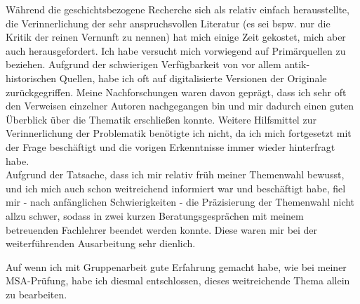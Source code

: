 \documentclass[12pt,a4paper,final]{article}
\begin{document}
Während die geschichtsbezogene Recherche sich als relativ einfach herausstellte, die Verinnerlichung der sehr anspruchsvollen Literatur (es sei bspw. nur die Kritik der reinen Vernunft %
 zu nennen) hat mich einige Zeit gekostet, mich aber auch herausgefordert. Ich habe versucht mich vorwiegend auf Primärquellen zu beziehen. Aufgrund der schwierigen Verfügbarkeit von vor allem antik-historischen Quellen, habe ich oft auf digitalisierte Versionen der Originale zurückgegriffen.
Meine Nachforschungen waren davon geprägt, dass ich sehr oft den Verweisen einzelner Autoren nachgegangen bin und mir dadurch einen guten Überblick über die Thematik erschließen konnte. Weitere Hilfsmittel zur Verinnerlichung der Problematik benötigte ich nicht, da ich mich fortgesetzt mit der Frage beschäftigt und die vorigen Erkenntnisse immer wieder hinterfragt habe.\\

Aufgrund der Tatsache, dass ich mir relativ früh meiner Themenwahl bewusst, und ich mich auch schon weitreichend informiert war und beschäftigt habe, fiel mir - nach anfänglichen Schwierigkeiten - die Präzisierung der Themenwahl nicht allzu schwer, sodass in zwei kurzen Beratungsgesprächen mit meinem betreuenden Fachlehrer beendet werden konnte. Diese waren mir bei der weiterführenden Ausarbeitung sehr dienlich.

Auf wenn ich mit Gruppenarbeit gute Erfahrung gemacht habe, wie bei meiner MSA-Prüfung, habe ich diesmal entschlossen, dieses weitreichende Thema allein zu bearbeiten.
\end{document}
